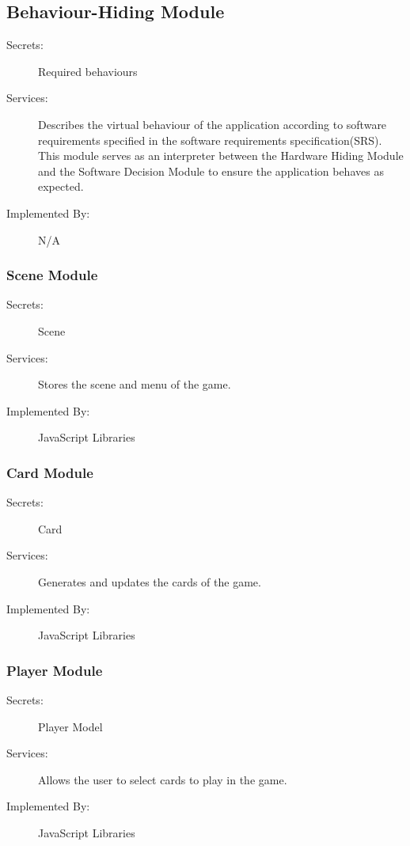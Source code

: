 \documentclass[12pt, titlepage]{article}
\begin{document}
\subsection{Behaviour-Hiding Module}

\begin{description}
\item[Secrets:] Required behaviours
\item[Services:] Describes the virtual behaviour of the application according to software requirements specified in the software requirements specification(SRS). This module serves as an interpreter between the Hardware Hiding Module and the Software Decision Module to ensure the application behaves as expected.
\item[Implemented By:] N/A
\end{description}

\subsubsection{Scene Module}

\begin{description}
\item[Secrets:] Scene
\item[Services:] Stores the scene and menu of the game.
\item[Implemented By:] JavaScript Libraries
\end{description}

\subsubsection{Card Module}

\begin{description}
\item[Secrets:] Card
\item[Services:] Generates and updates the cards of the game.
\item[Implemented By:] JavaScript Libraries
\end{description}

\subsubsection{Player Module}

\begin{description}
\item[Secrets:] Player Model
\item[Services:] Allows the user to select cards to play in the game.
\item[Implemented By:] JavaScript Libraries
\end{description}
\end{document}
